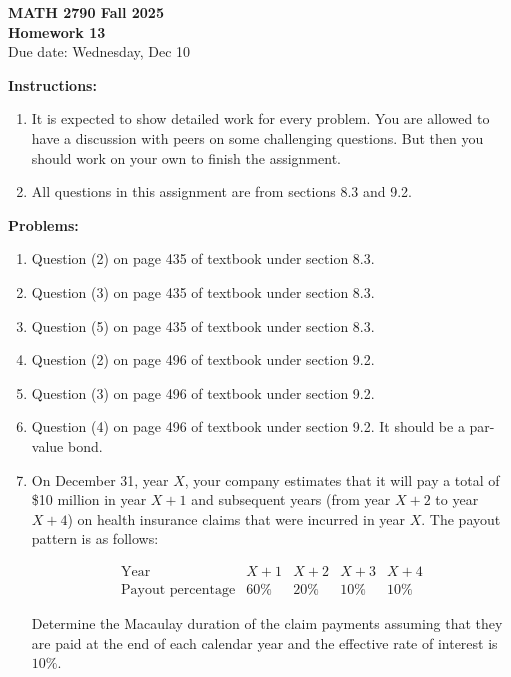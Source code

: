 \documentclass[12pt]{article}
\begin{document}
\begin{center}
\textbf{\Large MATH 2790 Fall 2025}\\[1em]
\textbf{\Large Homework 13}\\[0.5em]
Due date: Wednesday, Dec 10
\end{center}

\bigskip

\textbf{Instructions:}

\begin{enumerate}[label=(\alph*)]
\item It is expected to show detailed work for every problem. You are allowed to have a
discussion with peers on some challenging questions. But then you should work on
your own to finish the assignment.

\item All questions in this assignment are from sections 8.3 and 9.2.
\end{enumerate}

\bigskip

\textbf{Problems:}

\begin{enumerate}
\item Question (2) on page 435 of textbook under section 8.3.

\item Question (3) on page 435 of textbook under section 8.3.

\item Question (5) on page 435 of textbook under section 8.3.

\item Question (2) on page 496 of textbook under section 9.2.

\item Question (3) on page 496 of textbook under section 9.2.

\item Question (4) on page 496 of textbook under section 9.2. It should be a par-value bond.

\item On December 31, year $X$, your company estimates that it will pay a total of \$10 million in year $X+1$ and subsequent years (from year $X+2$ to year $X+4$) on health insurance claims that were incurred in year $X$. The payout pattern is as follows:

\[
\begin{array}{c|cccc}
\text{Year} & X+1 & X+2 & X+3 & X+4 \\ \hline
\text{Payout percentage} & 60\% & 20\% & 10\% & 10\%
\end{array}
\]

Determine the Macaulay duration of the claim payments assuming that they are paid
at the end of each calendar year and the effective rate of interest is $10\%$.
\end{enumerate}
\end{document}
